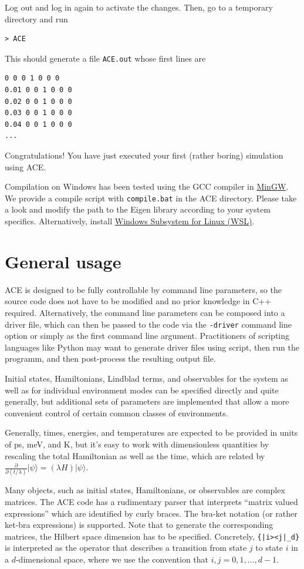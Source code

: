 \documentclass{scrartcl}
\begin{document}
Log out and log in again to activate the changes. 
Then, go to a temporary directory and run
\begin{verbatim}
> ACE
\end{verbatim}
This should generate a file \texttt{ACE.out} whose first lines are
\begin{verbatim}
0 0 0 1 0 0 0
0.01 0 0 1 0 0 0
0.02 0 0 1 0 0 0
0.03 0 0 1 0 0 0
0.04 0 0 1 0 0 0
...
\end{verbatim}
Congratulations! You have just executed your first (rather boring) simulation
using ACE.


Compilation on Windows has been tested using the GCC compiler in
\href{http://mingw-w64.org/doku.php}{MinGW}. We provide a compile script 
with \texttt{compile.bat} in the ACE directory. Please take a look and 
modify the path to the Eigen library according to your system specifics.
Alternatively, install 
\href{https://learn.microsoft.com/en-us/windows/wsl/install}{Windows Subsystem
for Linux (WSL)}.

\section{General usage}
ACE is designed to be fully controllable by command line parameters, so
the source code does not have to be modified and 
no prior knowledge in C++ required.
Alternatively, the command line parameters can be composed into a driver file,
which can then be passed to the code via the \texttt{-driver} command line 
option or simply as the first command line argument.
Practitioners of scripting languages like Python may want to generate driver
files using script, then run the programm, and then post-process the resulting
output file.
%

Initial states, Hamiltonians, Lindblad terms, and observables for the system 
as well as for individual environment modes can be specified directly and
quite generally, 
but additional sets of parameters are implemented that allow a more convenient
control of certain common classes of environments.

Generally, times, energies, and temperatures are expected to be provided
in units of ps, meV, and K, but it's easy to work with dimensionless 
quantities by rescaling the total Hamiltonian as well as the time, which 
are related by
$\frac{\partial}{\partial (t/\lambda)} |\psi\rangle = (\lambda H) |\psi\rangle$.

Many objects, such as initial states, Hamiltonians, or observables are
complex matrices. The ACE code has a rudimentary parser that interprets 
``matrix valued expressions'' which are identified by curly braces.
The bra-ket notation (or rather ket-bra expressions) is supported. 
Note that to generate the corresponding matrices, the Hilbert space dimension 
has to be specified. Concretely, \verb+{|i><j|_d}+ is interpreted as the 
operator that describes a transition from state $j$ to state $i$ in a 
$d$-dimensional space, where we use the convention that $i,j=0,1,\dots, d-1$.
\end{document}
